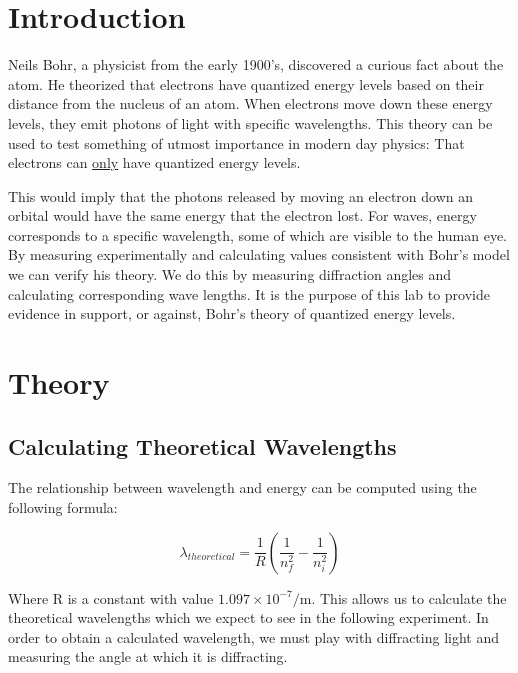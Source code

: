\documentclass[letterpaper,11pt] {article}
\begin{document}
\section{Introduction}

Neils Bohr, a physicist from the early 1900's, discovered a curious fact about the atom. He theorized that electrons have quantized energy levels based on their distance from the nucleus of an atom. When electrons move down these energy levels, they emit photons of light with specific wavelengths. This theory can be used to test something of utmost importance in modern day physics: That electrons can \underline{only} have quantized energy levels. 

This would imply that the photons released by moving an electron down an orbital would have the same energy that the electron lost. For waves, energy corresponds to a specific wavelength, some of which are visible to the human eye. By measuring experimentally and calculating values consistent with Bohr's model we can verify his theory. We do this by measuring diffraction angles and calculating corresponding wave lengths. It is the purpose of this lab to provide evidence in support, or against, Bohr's theory of quantized energy levels.


\section{Theory}

\subsection{Calculating Theoretical Wavelengths}

The relationship between wavelength and energy can be computed using the following formula: 

\begin{equation} \label{eq1}
    \lambda_{theoretical} = \frac{1}{R}\left(\frac{1}{n_f^2} - \frac{1}{n_i^2}\right)
\end{equation}

Where R is a constant with value $1.097 \times 10^{-7}/\text{m}$. This allows us to calculate the theoretical wavelengths which we expect to see in the following experiment. In order to obtain a calculated wavelength, we must play with diffracting light and measuring the angle at which it is diffracting.
\end{document}
